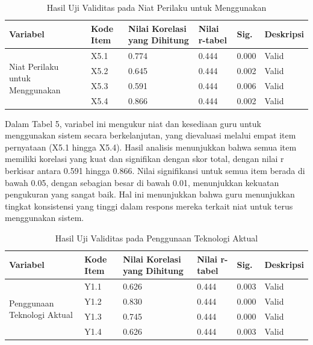     \begin{table}[H]
        \centering
        \caption{Hasil Uji Validitas pada Niat Perilaku untuk Menggunakan}
        \label{tab:uji-validitas-niat-perilaku}
        \begin{tabularx}{\textwidth}{p{5cm}lXXXl}
            \toprule
            \textbf{Variabel} & \textbf{Kode Item} & \textbf{Nilai Korelasi yang Dihitung} & \textbf{Nilai r-tabel} & \textbf{Sig.} & \textbf{Deskripsi} \\
            \midrule
            \multirow{4}{=}{Niat Perilaku untuk Menggunakan}
                & X5.1 & 0.774 & 0.444 & 0.000 & Valid \\
                & X5.2 & 0.645 & 0.444 & 0.002 & Valid \\
                & X5.3 & 0.591 & 0.444 & 0.006 & Valid \\
                & X5.4 & 0.866 & 0.444 & 0.002 & Valid \\
            \bottomrule
        \end{tabularx}
    \end{table}

    Dalam Tabel 5, variabel ini mengukur niat dan kesediaan guru untuk menggunakan sistem secara berkelanjutan, yang dievaluasi melalui empat item pernyataan (X5.1 hingga X5.4). Hasil analisis menunjukkan bahwa semua item memiliki korelasi yang kuat dan signifikan dengan skor total, dengan nilai r berkisar antara 0.591 hingga 0.866. Nilai signifikansi untuk semua item berada di bawah 0.05, dengan sebagian besar di bawah 0.01, menunjukkan kekuatan pengukuran yang sangat baik. Hal ini menunjukkan bahwa guru menunjukkan tingkat konsistensi yang tinggi dalam respons mereka terkait niat untuk terus menggunakan sistem.

    \begin{table}[H]
        \centering
        \caption{Hasil Uji Validitas pada Penggunaan Teknologi Aktual}
        \label{tab:uji-validitas-penggunaan-teknologi}
        \begin{tabularx}{\textwidth}{p{5cm}lXXXl}
            \toprule
            \textbf{Variabel} & \textbf{Kode Item} & \textbf{Nilai Korelasi yang Dihitung} & \textbf{Nilai r-tabel} & \textbf{Sig.} & \textbf{Deskripsi} \\
            \midrule
            \multirow{4}{=}{Penggunaan Teknologi Aktual}
                & Y1.1 & 0.626 & 0.444 & 0.003 & Valid \\
                & Y1.2 & 0.830 & 0.444 & 0.000 & Valid \\
                & Y1.3 & 0.745 & 0.444 & 0.000 & Valid \\
                & Y1.4 & 0.626 & 0.444 & 0.003 & Valid \\
            \bottomrule
        \end{tabularx}
    \end{table}

